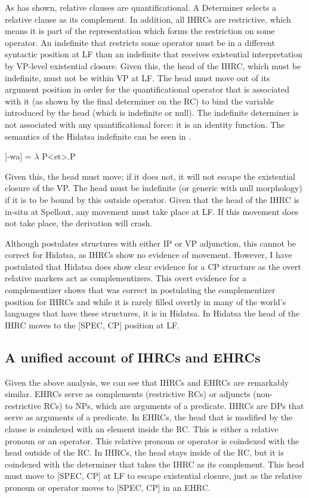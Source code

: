 \documentclass[output=paper]{LSP/langsci}
\begin{document}
As \citet{Basilico1996} has shown, relative clauses are quantificational. A Determiner selects a relative clause as its complement. In addition, all IHRCs are restrictive, which means it is part of the representation which forms the restriction on some operator. An indefinite that restricts some operator must be in a different syntactic position at LF than an indefinite that receives existential interpretation by VP-level existential closure. Given this, the head of the IHRC, which must be indefinite, must not be within VP at LF. The head must move out of its argument position in order for the quantificational operator that is associated with it (as shown by the final determiner on the RC) to bind the variable introduced by the head (which is indefinite or null). The indefinite determiner is not associated with any quantificational force: it is an identity function. The semantics of the Hidatsa indefinite can be seen in .

\ea \label{boyle48}
 [-wa] = $\lambda$ P<et>.P
\z
	
Given this, the head must move; if it does not, it will not escape the existential closure of the VP. The head must be indefinite (or generic with null morphology) if it is to be bound by this outside operator. Given that the head of the IHRC is in-situ at Spellout, any movement must take place at LF. If this movement does not take place, the derivation will crash.
	
Although \citet{Basilico1996} postulates structures with either IP or VP adjunction, this cannot be correct for Hidatsa, as IHRCs show no evidence of movement. However, I have postulated that Hidatsa does show clear evidence for a CP structure as the overt relative markers act as complementizers. This overt evidence for a complementizer shows that \citet{Culy1990} was correct in postulating the complementizer position for IHRCs and while it is rarely filled overtly in many of the world's languages that have these structures, it is in Hidatsa. In Hidatsa the head of the IHRC moves to the [SPEC, CP] position at LF.

\subsection{A unified account of IHRCs and EHRCs}

Given the above analysis, we can see that IHRCs and EHRCs are remarkably similar. EHRCs serve as complements (restrictive RCs) or adjuncts (non-restrictive RCs) to NPs, which are arguments of a predicate. IHRCs are DPs that serve as arguments of a predicate. In EHRCs, the head that is modified by the clause is coindexed with an element inside the RC. This is either a relative pronoun or an operator. This relative pronoun or operator is coindexed with the head outside of the RC. In IHRCs, the head stays inside of the RC, but it is coindexed with the determiner that takes the IHRC as its complement. This head must move to [SPEC, CP] at LF to escape existential closure, just as the relative pronoun or operator moves to [SPEC, CP] in an EHRC.
\end{document}
